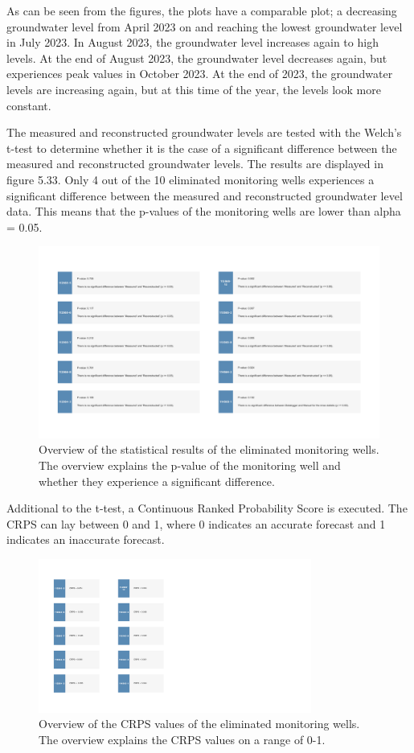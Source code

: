 As can be seen from the figures, the plots have a comparable plot; a decreasing groundwater level from April 2023 on and reaching the lowest groundwater level in July 2023. In August 2023, the groundwater level increases again to high levels. At the end of August 2023, the groundwater level decreases again, but experiences peak values in October 2023. At the end of 2023, the groundwater levels are increasing again, but at this time of the year, the levels look more constant. 

The measured and reconstructed groundwater levels are tested with the Welch's t-test to determine whether it is the case of a significant difference between the measured and reconstructed groundwater levels. The results are displayed in figure 5.33. Only 4 out of the 10 eliminated monitoring wells experiences a significant difference between the measured and reconstructed groundwater level data. This means that the p-values of the monitoring wells are lower than alpha = 0.05. 

\begin{figure}[htbp]
    \centering
    \includegraphics[width=0.80\linewidth]{hydrostatroz.png}
    \caption{Overview of the statistical results of the eliminated monitoring wells. The overview explains the p-value of the monitoring well and whether they experience a significant difference.}
\end{figure}

Additional to the t-test, a Continuous Ranked Probability Score is executed. The CRPS can lay between 0 and 1, where 0 indicates an accurate forecast and 1 indicates an inaccurate forecast. 

\begin{figure}[htbp]
    \centering
    \includegraphics[width=0.80\textwidth]{crpsroz.png}
    \caption{Overview of the CRPS values of the eliminated monitoring wells. The overview explains the CRPS values on a range of 0-1.}
\end{figure}

